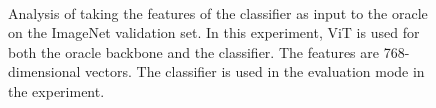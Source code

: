 \begin{figure}[!t]
	\centering
	 \hfill
	 \hfill
	 \\
	\caption{\label{fig:anal_featinput}
    	Analysis of taking the features of the classifier as input to the oracle on the ImageNet validation set. In this experiment, ViT is used for both the oracle backbone and the classifier. The features are 768-dimensional vectors. The classifier is used in the evaluation mode in the experiment.
    	}
\end{figure}